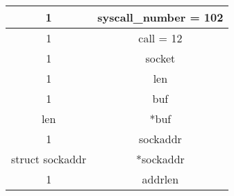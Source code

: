 \documentclass{report}
\begin{document}
\begin{tabular}{| c | c | }
\hline
1 & syscall\_number = 102 \\ \hline 
1 & call = 12 \\ \hline 
1 & socket \\ \hline 
1 & len \\ \hline 
1 & buf  \\ \hline
len & *buf  \\ \hline
1 & sockaddr  \\ \hline
struct sockaddr & *sockaddr \\ \hline
1 & addrlen  \\ \hline
\end{tabular}
\\
\end{document}
